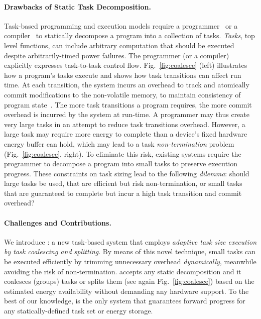 \paragraph{Drawbacks of Static Task Decomposition.}
Task-based programming and execution models require a programmer~\cite{alpaca,chain} or a compiler~\cite{baghsorkhi_cgo_2018} to statically decompose a program into a collection of tasks. \emph{Tasks}, top level functions, can include arbitrary computation that should be executed despite arbitrarily-timed power failures. The programmer (or a compiler) explicitly expresses task-to-task control flow. Fig.~\ref{fig:coalesce} (left) illustrates how a program's tasks execute and shows how task transitions can affect run time. At each transition, the system incurs an overhead to track and atomically commit modifications to the non-volatile memory, to maintain consistency of program state~\cite{chain,alpaca}. The more task transitions a program requires, the more commit overhead is incurred by the system at run-time. A programmer may thus create very large tasks in an attempt to reduce task transitions overhead. However, a large task may require more energy to complete than a device's fixed hardware energy buffer can hold, which may lead to a task \emph{non-termination} problem (Fig.~\ref{fig:coalesce}, right). To eliminate this risk, existing systems require the programmer to decompose a program into small tasks to preserve execution progress. These constraints on task sizing lead to the following \emph{dilemma}: should large tasks be used, that are efficient but risk non-termination, or small tasks that are guaranteed to complete but incur a high task transition and commit overhead?

\paragraph{Challenges and Contributions.}
We introduce \sys: a new task-based system that employs \emph{adaptive task size execution by task coalescing and splitting}. By means of this novel technique, small tasks can be executed efficiently by trimming unnecessary overhead \emph{dynamically}, meanwhile avoiding the risk of non-termination. \sys accepts any static decomposition and it coalesces (groups) tasks or splits them (see again Fig.~\ref{fig:coalesce}) based on the estimated energy availability without demanding any hardware support. To the best of our knowledge, \sys is the only system that guarantees forward progress for any statically-defined task  set or energy storage. 

